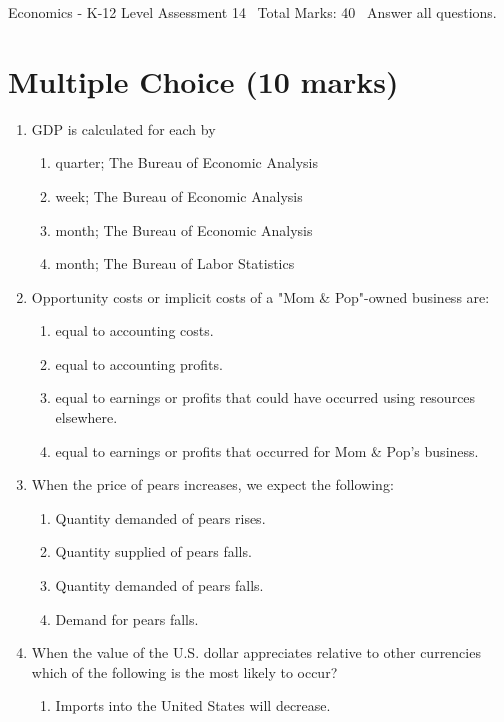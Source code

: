 \documentclass[12pt]{article}
\begin{document}
\begin{center}
Economics - K-12 Level Assessment 14 \
Total Marks: 40 \
Answer all questions.
\end{center}

\section*{Multiple Choice (10 marks)}
\begin{enumerate}[label=\arabic*.]
\item GDP is calculated for each by
\begin{enumerate}[label=(\alph*)]
    \item quarter; The Bureau of Economic Analysis
    \item week; The Bureau of Economic Analysis
    \item month; The Bureau of Economic Analysis
    \item month; The Bureau of Labor Statistics
\end{enumerate}
\item Opportunity costs or implicit costs of a "Mom \& Pop"-owned business are:
\begin{enumerate}[label=(\alph*)]
    \item equal to accounting costs.
    \item equal to accounting profits.
    \item equal to earnings or profits that could have occurred using resources elsewhere.
    \item equal to earnings or profits that occurred for Mom \& Pop's business.
\end{enumerate}
\item When the price of pears increases, we expect the following:
\begin{enumerate}[label=(\alph*)]
    \item Quantity demanded of pears rises.
    \item Quantity supplied of pears falls.
    \item Quantity demanded of pears falls.
    \item Demand for pears falls.
\end{enumerate}
\item When the value of the U.S. dollar appreciates relative to other currencies which of the following is the most likely to occur?
\begin{enumerate}[label=(\alph*)]
    \item Imports into the United States will decrease.

\end{enumerate}
\end{enumerate}
\end{document}
